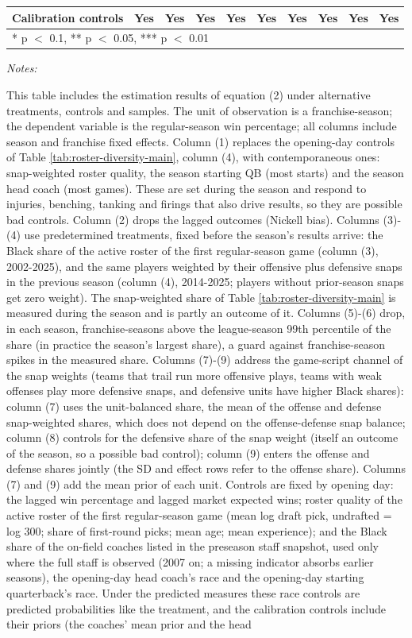 \begin{table}[!h]
{\begin{threeparttable}
\begin{tabular}[t]{lccccccccc}
Calibration controls & Yes & Yes & Yes & Yes & Yes & Yes & Yes & Yes & Yes\\
\bottomrule
\multicolumn{10}{l}{\rule{0pt}{1em}* p $<$ 0.1, ** p $<$ 0.05, *** p $<$ 0.01}\\
\end{tabular}
\begin{tablenotes}[para]
\item \textit{Notes:} 
\item This table includes the estimation results of equation (2) under alternative treatments, controls and samples. The unit of observation is a franchise-season; the dependent variable is the regular-season win percentage; all columns include season and franchise fixed effects. Column (1) replaces the opening-day controls of Table \ref{tab:roster-diversity-main}, column (4), with contemporaneous ones: snap-weighted roster quality, the season starting QB (most starts) and the season head coach (most games). These are set during the season and respond to injuries, benching, tanking and firings that also drive results, so they are possible bad controls. Column (2) drops the lagged outcomes (Nickell bias). Columns (3)-(4) use predetermined treatments, fixed before the season's results arrive: the Black share of the active roster of the first regular-season game (column (3), 2002-2025), and the same players weighted by their offensive plus defensive snaps in the previous season (column (4), 2014-2025; players without prior-season snaps get zero weight). The snap-weighted share of Table \ref{tab:roster-diversity-main} is measured during the season and is partly an outcome of it. Columns (5)-(6) drop, in each season, franchise-seasons above the league-season 99th percentile of the share (in practice the season's largest share), a guard against franchise-season spikes in the measured share.  Columns (7)-(9) address the game-script channel of the snap weights (teams that trail run more offensive plays, teams with weak offenses play more defensive snaps, and defensive units have higher Black shares): column (7) uses the unit-balanced share, the mean of the offense and defense snap-weighted shares, which does not depend on the offense-defense snap balance; column (8) controls for the defensive share of the snap weight (itself an outcome of the season, so a possible bad control); column (9) enters the offense and defense shares jointly (the SD and effect rows refer to the offense share). Columns (7) and (9) add the mean prior of each unit. Controls are fixed by opening day: the lagged win percentage and lagged market expected wins; roster quality of the active roster of the first regular-season game (mean log draft pick, undrafted = log 300; share of first-round picks; mean age; mean experience); and the Black share of the on-field coaches listed in the preseason staff snapshot, used only where the full staff is observed (2007 on; a missing indicator absorbs earlier seasons), the opening-day head coach's race and the opening-day starting quarterback's race. Under the predicted measures these race controls are predicted probabilities like the treatment, and the calibration controls include their priors (the coaches' mean prior and the head 
\end{tablenotes}
\end{threeparttable}}
\end{table}

